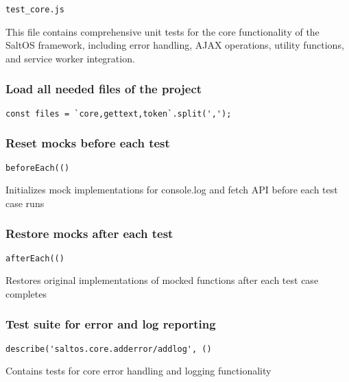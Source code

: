 \documentclass[a4paper]{article}
\begin{document}
\begin{lstlisting}
test_core.js
\end{lstlisting}

This file contains comprehensive unit tests for the core functionality
of the SaltOS framework, including error handling, AJAX operations,
utility functions, and service worker integration.

\hypertarget{toc479}{}
\subsubsection{Load all needed files of the project}

\begin{lstlisting}
const files = `core,gettext,token`.split(',');
\end{lstlisting}

\hypertarget{toc480}{}
\subsubsection{Reset mocks before each test}

\begin{lstlisting}
beforeEach(()
\end{lstlisting}

Initializes mock implementations for console.log and fetch API
before each test case runs

\hypertarget{toc481}{}
\subsubsection{Restore mocks after each test}

\begin{lstlisting}
afterEach(()
\end{lstlisting}

Restores original implementations of mocked functions
after each test case completes

\hypertarget{toc482}{}
\subsubsection{Test suite for error and log reporting}

\begin{lstlisting}
describe('saltos.core.adderror/addlog', ()
\end{lstlisting}

Contains tests for core error handling and logging functionality
\end{document}
